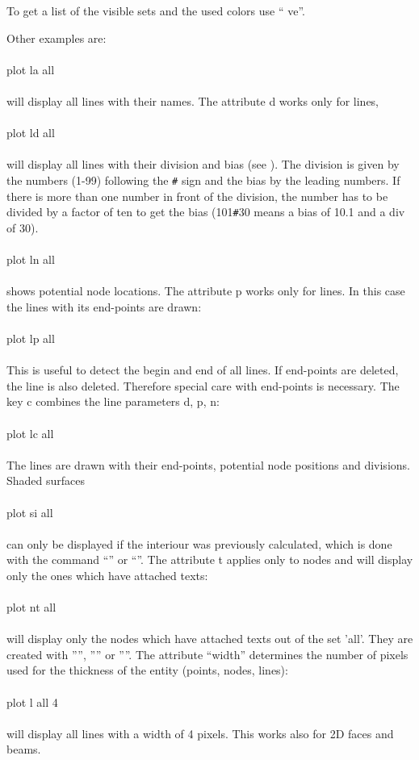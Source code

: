 \documentclass{article}
\begin{document}
To get a list of the visible sets and the used colors use `` ve''.

Other examples are:\\\\plot la all\\\\will display all lines with their names. The attribute d works only for lines,\\\\plot ld all\\\\ will display all lines with their division and bias (see ). The division is given by the numbers (1-99) following the \verb_#_ sign and the bias by the leading numbers. If there is more than one number in front of the division, the number has to be divided by a factor of ten to get the bias (101\verb_#_30 means a bias of 10.1 and a div of 30). \\\\plot ln all\\\\shows potential node locations. The attribute p works only for lines. In this case the lines with its end-points are drawn:\\\\plot lp all\\\\This is useful to detect the begin and end of all lines. If end-points are deleted, the line is also deleted. Therefore special care with end-points is necessary. The key c combines the line parameters d, p, n:\\\\plot lc all\\\\The lines are drawn with their end-points, potential node positions and divisions.
Shaded surfaces\\\\plot si all\\\\ can only be displayed if the interiour was previously calculated, which is done with the command ``'' or ``''. The attribute t applies only to nodes and will display only the ones which have attached texts:\\\\plot nt all\\\\will display only the nodes which have attached texts out of the set 'all'. They are created with '''', '''' or ''''. The attribute ``width'' determines the number of pixels used for the thickness of the entity (points, nodes, lines):\\\\plot l all 4\\\\will display all lines with a width of 4 pixels. This works also for 2D faces and beams.
\end{document}

